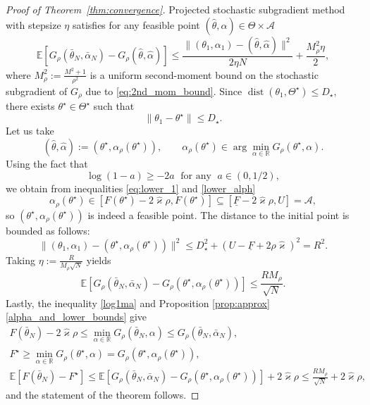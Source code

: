 \documentclass{article}
\newcommand{\R}{\mathbb{R}}
\newcommand{\E}{\mathbb{E}}
\theoremstyle{plain}
\theoremstyle{definition}
\theoremstyle{remark}
\begin{document}
\begin{proof}[Proof of Theorem~\ref{thm:convergence}]
Projected stochastic subgradient method with stepsize $\eta$ satisfies \citep{nemirovski2009robust} for any feasible point $(\hat{\theta},\hat{\alpha}) \in\Theta\times\mathcal{A}$
\[
    \E[G_\rho(\bar{\theta}_N,\bar{\alpha}_N) - G_\rho(\hat{\theta},\hat{\alpha})] \leq \frac{\|(\theta_1,\alpha_1)-(\hat{\theta},\hat{\alpha})\|^2}{2\eta N} + \frac{M_\rho^2\eta}{2},
\]
where $M_\rho^2:=\frac{M^2 + 1}{\rho^2}$ is a uniform second-moment bound on the stochastic subgradient of $G_\rho$ due to \eqref{eq:2nd_mom_bound}. 
Since \(\operatorname{dist}(\theta_1,\Theta^\star)\le D_\star\), 
there exists \(\theta^\star\in\Theta^\star\) such that
\[
    \|\theta_1-\theta^\star\|\le D_\star .
\]
Let us take
\[
    (\hat\theta,\hat\alpha)
    :=
    (\theta^\star,\alpha_\rho(\theta^\star)),
    \qquad
    \alpha_\rho(\theta^\star)
    \in
    \arg\min_{\alpha\in\R}G_\rho(\theta^\star,\alpha).
\] 
Using the fact that 
\begin{equation}\label{log1ma}
    \log(1-a) \geq -2a\; \text{ for any }\; a\in(0, 1/2),
\end{equation}
we obtain from inequalities \eqref{eq:lower_1} and \eqref{lower_alph} 
\[
    \alpha_{\rho}(\theta^\star) \in [F(\theta^\star)-2\hat{\varkappa}\rho, F(\theta^\star)] \subseteq [\underline{F}-2\hat{\varkappa}\rho, U]=\mathcal{A},
\]
so $(\theta^\star,\alpha_{\rho}(\theta^\star))$ is indeed a feasible point. The distance to the initial point is bounded as follows:
\[ 
    \|(\theta_1,\alpha_1)-(\theta^\star,\alpha_\rho(\theta^\star))\|^2 \le
    D_\star^2
    + 
    (U-\underline F+2\rho\hat{\varkappa})^2 = R^2 . 
\]
Taking \(\eta:=\frac{R}{M_\rho \sqrt{N}}\) yields
\[
    \E[G_\rho(\bar{\theta}_N,\bar{\alpha}_N) - G_\rho(\theta^\star,\alpha_{\rho}(\theta^\star))] \leq \frac{R M_\rho}{\sqrt{N}}.
\]
Lastly, the inequality \eqref{log1ma} and Proposition \ref{prop:approx} \ref{alpha_and_lower_bounds} give
\begin{gather*}
    F(\bar{\theta}_N) - 2\hat{\varkappa}\rho \leq \min_{\alpha\in \R}G_\rho(\bar{\theta}_N, \alpha) \leq G_\rho(\bar{\theta}_N,\bar{\alpha}_N),\\
    F^\star \geq \min_{\alpha\in\R} G_\rho(\theta^\star,\alpha) = G_\rho(\theta^\star,\alpha_{\rho}(\theta^\star)), \\
    \E[ F(\bar{\theta}_N) - F^\star] \leq \E[G_\rho(\bar{\theta}_N,\bar{\alpha}_N) - G_\rho(\theta^\star,\alpha_{\rho}(\theta^\star))] + 2\hat{\varkappa}\rho \leq \frac{R M_\rho}{\sqrt{N}} + 2\hat{\varkappa}\rho,
\end{gather*}
and the statement of the theorem follows.
\end{proof}
\end{document}
